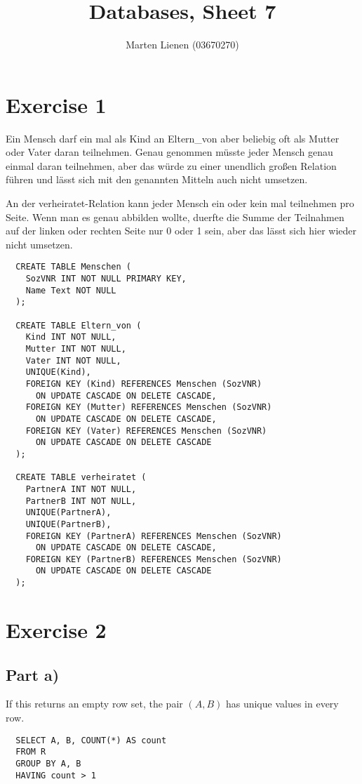 \documentclass[10pt,a4paper]{article}
\title{Databases, Sheet 7}
\author{Marten Lienen (03670270)}
\begin{document}
\maketitle

\section*{Exercise 1}

Ein Mensch darf ein mal als Kind an Eltern\_von aber beliebig oft als Mutter oder Vater daran teilnehmen.
Genau genommen müsste jeder Mensch genau einmal daran teilnehmen, aber das würde zu einer unendlich großen Relation führen und lässt sich mit den genannten Mitteln auch nicht umsetzen.

An der verheiratet-Relation kann jeder Mensch ein oder kein mal teilnehmen pro Seite.
Wenn man es genau abbilden wollte, duerfte die Summe der Teilnahmen auf der linken oder rechten Seite nur 0 oder 1 sein, aber das lässt sich hier wieder nicht umsetzen.

\begin{verbatim}
  CREATE TABLE Menschen (
    SozVNR INT NOT NULL PRIMARY KEY,
    Name Text NOT NULL
  );

  CREATE TABLE Eltern_von (
    Kind INT NOT NULL,
    Mutter INT NOT NULL,
    Vater INT NOT NULL,
    UNIQUE(Kind),
    FOREIGN KEY (Kind) REFERENCES Menschen (SozVNR)
      ON UPDATE CASCADE ON DELETE CASCADE,
    FOREIGN KEY (Mutter) REFERENCES Menschen (SozVNR)
      ON UPDATE CASCADE ON DELETE CASCADE,
    FOREIGN KEY (Vater) REFERENCES Menschen (SozVNR)
      ON UPDATE CASCADE ON DELETE CASCADE
  );

  CREATE TABLE verheiratet (
    PartnerA INT NOT NULL,
    PartnerB INT NOT NULL,
    UNIQUE(PartnerA),
    UNIQUE(PartnerB),
    FOREIGN KEY (PartnerA) REFERENCES Menschen (SozVNR)
      ON UPDATE CASCADE ON DELETE CASCADE,
    FOREIGN KEY (PartnerB) REFERENCES Menschen (SozVNR)
      ON UPDATE CASCADE ON DELETE CASCADE
  );
\end{verbatim}

\section*{Exercise 2}

\subsection*{Part a)}

If this returns an empty row set, the pair $(A, B)$ has unique values in every row.
\begin{verbatim}
  SELECT A, B, COUNT(*) AS count
  FROM R
  GROUP BY A, B
  HAVING count > 1
\end{verbatim}
\end{document}
